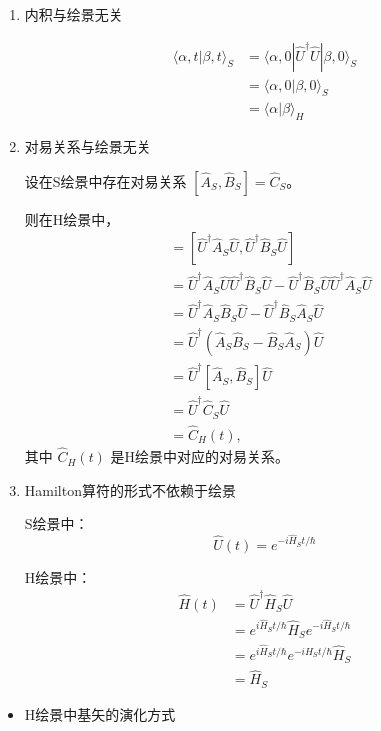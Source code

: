 \documentclass[lang=cn,10pt]{elegantbook}
\begin{document}
\begin{enumerate}
	\item  内积与绘景无关
	
	\begin{align*}
		\langle \alpha, t | \beta, t \rangle_{S} &= \langle \alpha, 0 | \hat{U}^\dagger \hat{U} | \beta, 0 \rangle_{S} \\
		&= \langle \alpha, 0 | \beta, 0 \rangle_{S} \\
		&= \langle \alpha | \beta \rangle_{H}
	\end{align*}
	
	\item 对易关系与绘景无关
	
	设在S绘景中存在对易关系 \([ \hat{A}_S, \hat{B}_S ] = \hat{C}_S\)。
	
	则在H绘景中，
	\begin{align*}
		[\hat{A}_H(t), \hat{B}_H(t)] &= [\hat{U}^\dagger \hat{A}_S \hat{U}, \hat{U}^\dagger \hat{B}_S \hat{U}] \\
		&= \hat{U}^\dagger \hat{A}_S \hat{U} \hat{U}^\dagger \hat{B}_S \hat{U} - \hat{U}^\dagger \hat{B}_S \hat{U} \hat{U}^\dagger \hat{A}_S \hat{U} \\
		&= \hat{U}^\dagger \hat{A}_S \hat{B}_S \hat{U} - \hat{U}^\dagger \hat{B}_S \hat{A}_S \hat{U} \\
		&= \hat{U}^\dagger (\hat{A}_S \hat{B}_S - \hat{B}_S \hat{A}_S) \hat{U} \\
		&= \hat{U}^\dagger [\hat{A}_S, \hat{B}_S] \hat{U} \\
		&= \hat{U}^\dagger \hat{C}_S \hat{U} \\
		&= \hat{C}_H(t),
	\end{align*}
	其中 \(\hat{C}_H(t)\) 是H绘景中对应的对易关系。
	
	\item Hamilton算符的形式不依赖于绘景
	
	S绘景中：
	\[ \hat{U}(t) = e^{-i \hat{H}_S t / \hbar} \]
	
	H绘景中：
	\begin{align*}
		\hat{H}(t) &= \hat{U}^\dagger \hat{H}_S \hat{U} \\
		&= e^{i \hat{H}_S t / \hbar} \hat{H}_S e^{-i \hat{H}_S t / \hbar} \\
		&= e^{i \hat{H}_S t / \hbar} e^{-i \hat{H}_S t / \hbar} \hat{H}_S \\
		&= \hat{H}_S
	\end{align*}
	
\end{enumerate}
\begin{itemize}
	\item H绘景中基矢的演化方式
\end{itemize}
\end{document}
